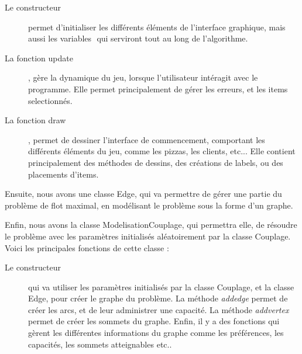 \documentclass{scrreprt}
\begin{document}
	\begin{description}
		\item[Le constructeur] permet d'initialiser les différents éléments de l'interface graphique, mais aussi les variables ​
		 qui serviront tout au long de l'algorithme.
		\item[La fonction update], gère la dynamique du jeu, lorsque l'utilisateur intéragit avec le programme.
		 Elle permet principalement de gérer les erreurs, et les items selectionnés.
		\item[La fonction draw], permet de dessiner l'interface de commencement, comportant les différents éléments du jeu,
		 comme les pizzas, les clients, etc... Elle contient principalement des méthodes de dessins, des créations de labels,
		 ou des placements d'items.
	\end{description}

	Ensuite, nous avons une classe Edge, qui va permettre de gérer une partie du problème de flot maximal, en modélisant le problème
	 sous la forme d'un graphe.

	Enfin, nous avons la classe ModelisationCouplage, qui permettra elle, de résoudre le problème avec les paramètres initialisés
	 aléatoirement par la classe Couplage. Voici les principales fonctions de cette classe :

	\begin{description}
		\item[Le constructeur] qui va utiliser les paramètres initialisés par la classe Couplage, et la classe Edge, pour créer le
		 graphe du problème. La méthode \emph{addedge} permet de créer les arcs, et de leur administrer une capacité. 
		 La méthode \emph{addvertex} permet de créer les sommets du graphe. Enfin, il y a des fonctions qui gèrent les différentes informations
		 du graphe comme les préférences, les capacités, les sommets atteignables etc..
	\end{description}
\end{document}
